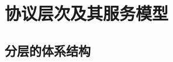 \documentclass[10pt,UTF8]{book} %
\begin{document}
\section{协议层次及其服务模型}

\subsection{分层的体系结构}

\end{document}

